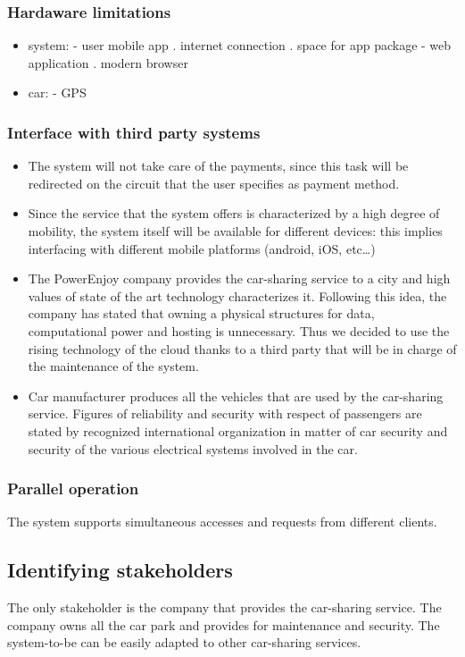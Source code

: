 \documentclass[10pt, a4paper,titlepage]{article}
\begin{document}
\subsubsection{Hardaware limitations}
\begin{itemize}
\item system:
\subitem - user mobile app
\subsubitem . internet connection
\subsubitem . space for app package
\subitem - web application
\subsubitem . modern browser
\item car:
\subitem - GPS
\end{itemize}
\subsubsection{Interface with third party systems}
\begin{itemize}
\item The system will not take care of the payments, since this task will be redirected on the circuit that the user specifies as payment method.
\item Since the service that the system offers is characterized by a high degree of mobility, the system itself will be available for different devices: this implies interfacing with different mobile platforms (android, iOS, etc…)
\item The PowerEnjoy company provides the car-sharing service to a city and high values of state of the art technology characterizes it. Following this idea, the company has stated that owning a physical structures for data, computational power and hosting is unnecessary. Thus we decided to use the rising technology of the cloud thanks to a third party that will be in charge of the maintenance of the system.
\item Car manufacturer produces all the vehicles that are used by the car-sharing service. Figures of reliability and security with respect of passengers are stated by recognized international organization in matter of car security and security of the various electrical systems involved in the car.
\end{itemize}
\subsubsection{Parallel operation}
The system supports simultaneous accesses and requests from different clients.
\subsection{Identifying stakeholders}
The only stakeholder is the company that provides the car-sharing service. The company owns all the car park and provides for maintenance and security. The system-to-be can be easily adapted to other car-sharing services.
\end{document}
